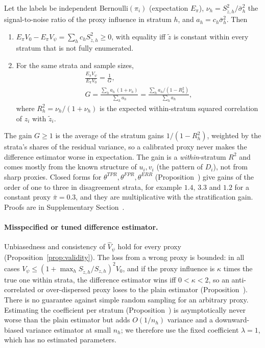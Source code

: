 \begin{proposition}\label{prop:dif-deff}
Let the labels be independent Bernoulli$(\pi_i)$ (expectation $E_\pi$), $\nu_h=S^2_{\tilde z,h}/\bar\sigma^2_h$ the signal-to-noise ratio of the proxy
influence in stratum $h$, and $a_h=c_h\bar\sigma^2_h$. Then
\begin{enumerate}
\item[(a)] $E_\pi V_0-E_\pi V_\psi=\sum_hc_hS^2_{\tilde z,h}\ge0$, with equality iff $\tilde z$ is constant within every stratum that is not fully enumerated.
\item[(b)] For the same strata and sample sizes,
\begin{equation}\label{eq:dif-deff}
\begin{gathered}
\frac{E_\pi V_\psi}{E_\pi V_0}=\frac1G,\\
G=\frac{\sum_ha_h\,(1+\nu_h)}{\sum_ha_h}=\frac{\sum_ha_h/(1-R_h^2)}{\sum_ha_h},
\end{gathered}
\end{equation}
where $R_h^2=\nu_h/(1+\nu_h)$ is the expected within-stratum squared correlation of $z_i$ with $\tilde z_i$.
\end{enumerate}
\end{proposition}

The gain $G\ge1$ is the average of the stratum gains $1/(1-R_h^2)$, weighted by the strata's shares of the residual variance, so a calibrated
proxy never makes the difference estimator worse in expectation. The gain is a \emph{within}-stratum $R^2$ and comes mostly from the known structure of
$u_i,v_i$ (the pattern of $D_i$), not from sharp proxies. Closed forms for $\theta^{TPR},\theta^{FPR},\theta^{ERR}$
(Proposition~) give gains of the order of one to three in disagreement strata, for example $1.4$, $3.3$ and $1.2$ for a constant proxy $\bar\pi=0.3$, and
they are multiplicative with the stratification gain. Proofs are in Supplementary Section~.

\paragraph{Misspecified or tuned difference estimator.} Unbiasedness and consistency of $\hat V_\psi$ hold for every proxy
(Proposition~\ref{prop:validity}). The loss from a wrong proxy is bounded: in all cases $V_\psi\le(1+\max_hS_{\tilde z,h}/S_{z,h})^2V_0$,
and if the proxy influence is $\kappa$ times the true one within strata, the difference estimator wins iff $0<\kappa<2$, so an anti-correlated or over-dispersed proxy loses to the plain estimator
(Proposition~). There is no guarantee against simple random sampling for an arbitrary proxy. Estimating the coefficient per stratum
(Proposition~) is asymptotically never worse than the plain estimator but adds $O(1/n_h)$ variance and a downward-biased
variance estimator at small $n_h$; we therefore use the fixed coefficient $\lambda=1$, which has no estimated parameters.


